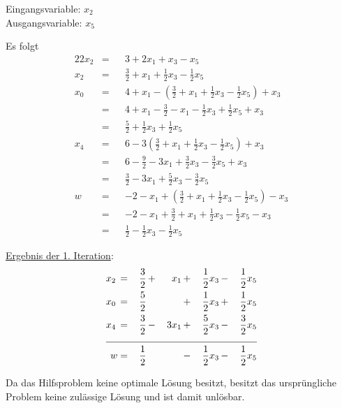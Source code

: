 \documentclass[10pt,a4paper,oneside,ngerman,numbers=noenddot]{scrartcl}
\begin{document}
		Eingangsvariable: $x_{2}$ \\
		Ausgangsvariable: $x_{5}$
		
		Es folgt
		\begin{alignat*}{2}
			2x_{2} &=&& 3 + 2x_{1} + x_{3} - x_{5} \\
			x_{2} &=&& \frac{3}{2} + x_{1} + \frac{1}{2}x_{3} - \frac{1}{2}x_{5} \\
			x_{0} &=&& 4 + x_{1} - \left(\frac{3}{2} + x_{1} + \frac{1}{2}x_{3} - \frac{1}{2}x_{5}\right) + x_{3} \\
			&=&& 4 + x_{1} - \frac{3}{2} - x_{1} - \frac{1}{2}x_{3} + \frac{1}{2}x_{5} + x_{3}\\
			&=&& \frac{5}{2} + \frac{1}{2}x_{3} + \frac{1}{2}x_{5} \\
			x_{4} &=&& 6 - 3\left(\frac{3}{2} + x_{1} + \frac{1}{2}x_{3} - \frac{1}{2}x_{5}\right) + x_{3} \\
			&=&& 6 - \frac{9}{2} - 3x_{1} + \frac{3}{2}x_{3} - \frac{3}{2}x_{5} + x_{3}\\
			&=&& \frac{3}{2} - 3x_{1} + \frac{5}{2}x_{3} - \frac{3}{2}x_{5} \\
			w &=&& -2 - x_{1} + \left(\frac{3}{2} + x_{1} + \frac{1}{2}x_{3} - \frac{1}{2}x_{5}\right) - x_{3} \\
			&=&& -2 - x_{1} + \frac{3}{2} + x_{1} + \frac{1}{2}x_{3} - \frac{1}{2}x_{5} - x_{3} \\
			&=&& \frac{1}{2} - \frac{1}{2}x_{3} - \frac{1}{2}x_{5}
		\end{alignat*}
		
		\underline{Ergebnis der 1. Iteration}:
		\begin{alignat*}{5}
			x_{2} \,&=&\, \frac{3}{2} \,&+&\, x_{1} \,&+&\, \frac{1}{2}x_{3} \,&-&\, \frac{1}{2}x_{5}  \\
			x_{0} \,&=&\, \frac{5}{2} \,&& &+&\, \frac{1}{2}x_{3} \,&+&\, \frac{1}{2}x_{5} \\
			x_{4} \,&=&\, \frac{3}{2} \,&-&\, 3x_{1} \,&+&\, \frac{5}{2}x_{3} \,&-&\, \frac{3}{2}x_{5} \\ \cline{1 - 9}
			w &=& \frac{1}{2} \,&& &-&\, \frac{1}{2}x_{3} \,&-&\, \frac{1}{2}x_{5}
		\end{alignat*}
		
		Da das Hilfsproblem keine optimale Lösung besitzt, besitzt das ursprüngliche Problem keine zulässige Lösung und ist damit unlösbar.
		
\end{document}
